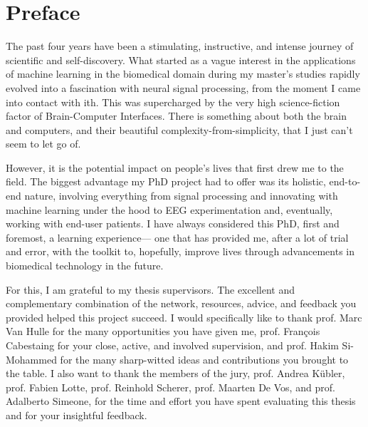 \chapter*{Preface}

The past four years have been a stimulating, instructive, and intense
journey of scientific and self-discovery. What started as a vague interest
in the applications of machine learning in the biomedical domain during
my master's studies rapidly evolved into a fascination with neural
signal processing, from the moment I came into contact with ith.
This was supercharged by the very high science-fiction factor
of Brain-Computer Interfaces.
There is something about both the brain and computers, and
their beautiful complexity-from-simplicity, that I just can't
seem to let go of.

However, it is the potential impact on people's lives that first drew
me to the field. The biggest advantage my PhD project had to offer was
its holistic, end-to-end nature, involving everything from signal
processing and innovating with machine learning under the hood to EEG
experimentation and, eventually, working with end-user patients. I have
always considered this PhD, first and foremost, a learning experience—
one that has provided me, after a lot of trial and error, with the
toolkit to, hopefully, improve lives through advancements in biomedical
technology in the future.

For this, I am grateful to my thesis supervisors. The excellent and
complementary combination of the network, resources, advice, and
feedback you provided helped this project succeed. I would specifically
like to thank prof. Marc Van Hulle for the many opportunities you have
given me, prof. François Cabestaing for your close, active, and
involved supervision, and prof. Hakim Si-Mohammed for the many
sharp-witted ideas and contributions you brought to the table. I also
want to thank the members of the jury, prof. Andrea Kübler, prof.
Fabien Lotte, prof. Reinhold Scherer, prof. Maarten De Vos, and prof.
Adalberto Simeone, for the time and effort you have spent evaluating
this thesis and for your insightful feedback.

